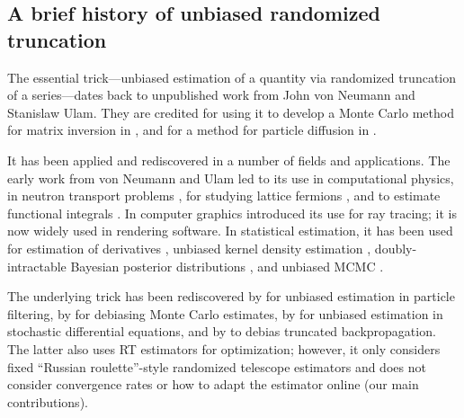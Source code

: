 \subsection{A brief history of unbiased randomized truncation}
\label{sec:history}
The essential trick---unbiased estimation of a quantity via randomized truncation of a series---dates back to unpublished work from John von Neumann and Stanislaw Ulam.
They are credited for using it to develop a Monte Carlo method for matrix inversion in \citet{forsythe1950matrix}, and for a method for particle diffusion in \citet{kahn1955use}.

It has been applied and rediscovered in a number of fields and applications.
The early work from von Neumann and Ulam led to its use in computational physics, in neutron transport problems \citep{spanier1969monte}, for studying lattice fermions \citep{kuti1982stochastic}, and to estimate functional integrals \citep{wagner1987unbiased}.
In computer graphics \citet{arvo1990particle} introduced its use for ray tracing; it is now widely used in rendering software.
In statistical estimation, it has been used for estimation of derivatives \citep{rychlik1990unbiased}, unbiased kernel density estimation \citep{rychlik1995class}, doubly-intractable Bayesian posterior distributions \citep{girolami2013playing, lyne2015russian, wei2016markov}, and unbiased MCMC \citep{jacob2017unbiased}.

The underlying trick has been rediscovered by \citet{fearnhead2008particle} for unbiased estimation in particle filtering, by \citet{mcleish2010general} for debiasing Monte Carlo estimates, by \citet{rhee2012new, rhee2015unbiased} for unbiased estimation in stochastic differential equations,
and by \citet{tallec2017unbiasing} to debias truncated backpropagation.
The latter also uses RT estimators for optimization; however, it only considers fixed ``Russian roulette''-style randomized telescope estimators and does not consider convergence rates or how to adapt the estimator online (our main contributions).
